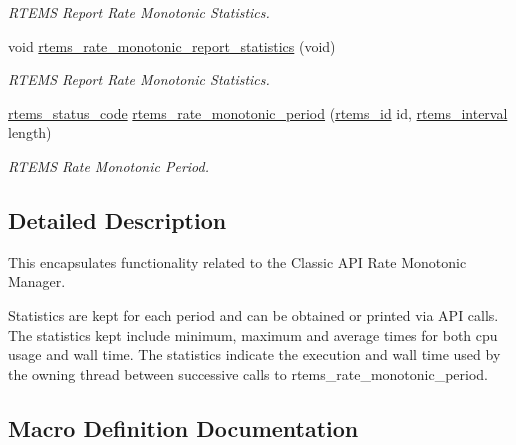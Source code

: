 \begin{DoxyCompactItemize}
\begin{DoxyCompactList}\small\item\em R\+T\+E\+MS Report Rate Monotonic Statistics. \end{DoxyCompactList}\item 
void \mbox{\hyperlink{group__ClassicRateMon_ga556dec002aada3b85d6af370fe233848}{rtems\+\_\+rate\+\_\+monotonic\+\_\+report\+\_\+statistics}} (void)
\begin{DoxyCompactList}\small\item\em R\+T\+E\+MS Report Rate Monotonic Statistics. \end{DoxyCompactList}\item 
\mbox{\hyperlink{group__ClassicStatus_ga545d41846817eaba6143d52ee4d9e9fe}{rtems\+\_\+status\+\_\+code}} \mbox{\hyperlink{group__ClassicRateMon_ga4ad92b1400f90f5078ff3302f20da372}{rtems\+\_\+rate\+\_\+monotonic\+\_\+period}} (\mbox{\hyperlink{group__ClassicTasks_gab20892b814dced7dd4e5b9bf42becd57}{rtems\+\_\+id}} id, \mbox{\hyperlink{group__ClassicTasks_gad39c43f949683d46874e3a5586b93aee}{rtems\+\_\+interval}} length)
\begin{DoxyCompactList}\small\item\em R\+T\+E\+MS Rate Monotonic Period. \end{DoxyCompactList}\end{DoxyCompactItemize}


\subsection{Detailed Description}
This encapsulates functionality related to the Classic A\+PI Rate Monotonic Manager.

Statistics are kept for each period and can be obtained or printed via A\+PI calls. The statistics kept include minimum, maximum and average times for both cpu usage and wall time. The statistics indicate the execution and wall time used by the owning thread between successive calls to rtems\+\_\+rate\+\_\+monotonic\+\_\+period. 

\subsection{Macro Definition Documentation}
\mbox{\label{group__ClassicRateMon_gaf1f0419cc6ef710bd429a5e7a01242c4}} 

